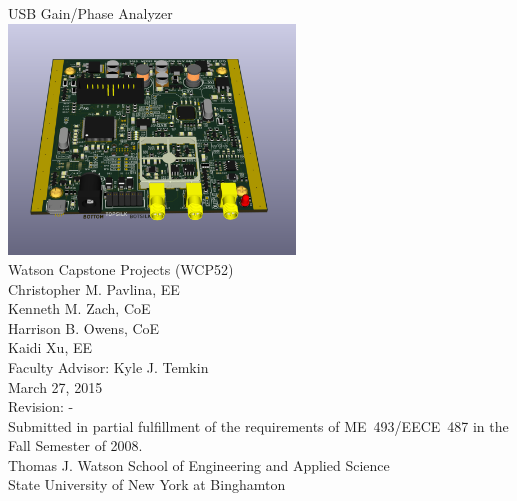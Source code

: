 \begin{titlingpage}
\begin{vplace}[0.5]
\begin{center}
{\Huge USB Gain/Phase Analyzer} \\
\includegraphics[width=3in]{full3d.png} \\
{\Huge Watson Capstone Projects (WCP52)} \\ \vspace{1cm}
{\Huge Christopher M. Pavlina, EE} \\
{\Huge Kenneth M. Zach, CoE} \\
{\Huge Harrison B. Owens, CoE} \\
{\Huge Kaidi Xu, EE} \\ \vspace{1cm}
{\Huge Faculty Advisor: Kyle J. Temkin} \\ \vspace{1cm}
{\Huge March 27, 2015} \\
{\Huge Revision: -} \\ \vspace{1cm}
{Submitted in partial fulfillment of the requirements of ME~493/EECE~487 in the Fall Semester of 2008.} \\ \vspace{1cm}
{Thomas J. Watson School of Engineering and Applied Science} \\
{State University of New York at Binghamton} \\
\end{center}
\end{vplace}
\end{titlingpage}
